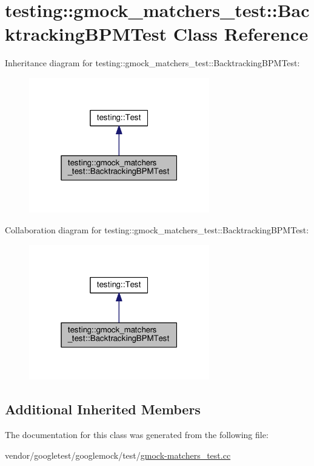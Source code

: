 \hypertarget{classtesting_1_1gmock__matchers__test_1_1BacktrackingBPMTest}{}\section{testing\+:\+:gmock\+\_\+matchers\+\_\+test\+:\+:Backtracking\+B\+P\+M\+Test Class Reference}
\label{classtesting_1_1gmock__matchers__test_1_1BacktrackingBPMTest}


Inheritance diagram for testing\+:\+:gmock\+\_\+matchers\+\_\+test\+:\+:Backtracking\+B\+P\+M\+Test\+:
\nopagebreak
\begin{figure}[H]
\begin{center}
\leavevmode
\includegraphics[width=223pt]{classtesting_1_1gmock__matchers__test_1_1BacktrackingBPMTest__inherit__graph}
\end{center}
\end{figure}


Collaboration diagram for testing\+:\+:gmock\+\_\+matchers\+\_\+test\+:\+:Backtracking\+B\+P\+M\+Test\+:
\nopagebreak
\begin{figure}[H]
\begin{center}
\leavevmode
\includegraphics[width=223pt]{classtesting_1_1gmock__matchers__test_1_1BacktrackingBPMTest__coll__graph}
\end{center}
\end{figure}
\subsection*{Additional Inherited Members}


The documentation for this class was generated from the following file\+:\begin{DoxyCompactItemize}
\item 
vendor/googletest/googlemock/test/\hyperlink{gmock-matchers__test_8cc}{gmock-\/matchers\+\_\+test.\+cc}\end{DoxyCompactItemize}
